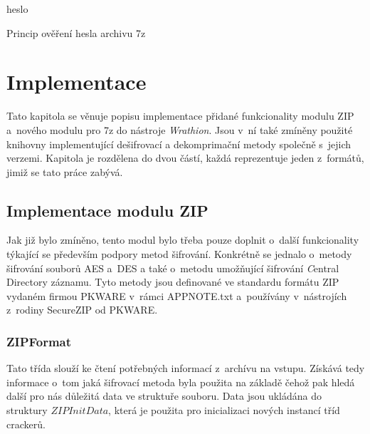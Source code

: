 \begin{algorithm}[!h]
    \SetStartEndCondition{ (}{)}{)}\SetAlgoBlockMarkers{}{}%
    \AlgoDisplayBlockMarkers\SetAlgoNoLine%
    \DontPrintSemicolon
    \Return heslo\;
    \caption{Princip ověření hesla archivu 7z}
    \label{alg:7z_desifr}
\end{algorithm}
    
\chapter{Implementace}
\label{ch:implementace}
Tato kapitola se věnuje popisu implementace přidané funkcionality modulu ZIP a~nového modulu pro
7z do nástroje {\it Wrathion}. Jsou v~ní také zmíněny použité knihovny implementující dešifrovací
a dekomprimační metody společně s~jejich verzemi. Kapitola je rozdělena do dvou částí, každá
reprezentuje jeden z~formátů, jimiž se tato práce zabývá.

\section{Implementace modulu ZIP}
Jak již bylo zmíněno, tento modul bylo třeba pouze doplnit o~další funkcionality týkající se 
především podpory metod šifrování. Konkrétně se jednalo o~metody šifrování souborů AES a~DES a
také o~metodu umožňující šifrování {\textit Central Directory} záznamu. Tyto metody jsou
definované ve standardu formátu ZIP vydaném firmou PKWARE v~rámci APPNOTE.txt a~používány
v~nástrojích z~rodiny SecureZIP od PKWARE.

\subsection{ZIPFormat}
Tato třída slouží ke čtení potřebných informací z~archívu na vstupu. Získává tedy informace o~tom
jaká šifrovací metoda byla použita na základě čehož pak hledá další pro nás důležitá data ve
struktuře souboru. Data jsou ukládána do struktury $ZIPInitData$, která je použita pro
inicializaci nových instancí tříd crackerů. 

